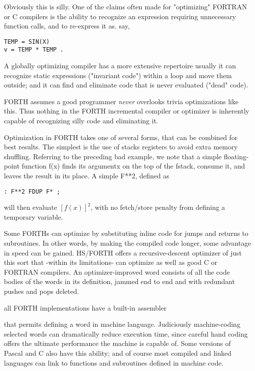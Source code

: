 Obviously this is silly. One of the claims often made for "optimizing" FORTRAN
or C compilers is the ability to recognize an
expression requiring unnecessary function calls, and to re-express
it as. say,
  
\begin{verbatim}
TEMP = SIN(X)
v = TEMP * TEMP .
\end{verbatim}

A globally optimizing compiler has a more extensive repertoire
usually it can recognize static expressions ("invariant code")
within a loop and move them outside; and it can find and eliminate code that is
never evaluated ("dead" code).

FORTH assumes a good programmer \textit{never} overlooks trivia
optimizations like this. Thus nothing in the FORTH incremental
compiler or optimizer is inherently capable of recognizing silly
code and eliminating it.

Optimization in FORTH takes one of several forms, that can be
combined for best results. The simplest is the use of stacks
registers to avoid extra memory shuffling. Referring to the
preceding bad example, we note that a simple floating-point
function f(x) finds its argumentx on the top of the fstack, consume
it, and leaves the result in its place. A simple F**2, defined as

\begin{verbatim}
: F**2 FDUP F* ;
\end{verbatim}

will then evaluate $[f(x)]^2$, with no fetch/store penalty from defining
a temporary variable.

Some FORTHs can optimize by substituting inline code for jumps
and returns to subroutines. In other words, by making the compiled code longer,
some advantage in speed can be gained.
HS/FORTH offers a recursive-descent optimizer of just this sort
that -within its limitations- can optimize as well as good C or
FORTRAN compilers. An optimizer-improved word consists of
all the code bodies of the words in its definition, jammed end to
end and with redundant pushes and pops deleted.

 all FORTH implementations have a built-in assembler

that permits defining a word in machine language. Judiciously
machine-coding selected words can dramatically reduce execution time, since
careful hand coding offers the ultimate performance the machine is capable of.
Some versions of Pascal and C
also have this ability; and of course most compiled and linked
languages can link to functions and subroutines defined in
machine code.

